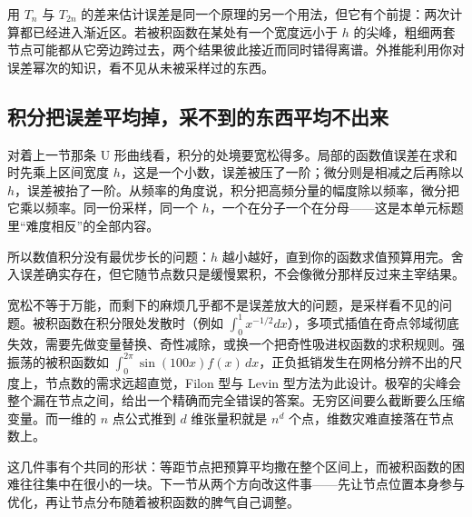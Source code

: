 用 \(T_n\) 与 \(T_{2n}\) 的差来估计误差是同一个原理的另一个用法，但它有个前提：两次计算都已经进入渐近区。若被积函数在某处有一个宽度远小于 \(h\) 的尖峰，粗细两套节点可能都从它旁边跨过去，两个结果彼此接近而同时错得离谱。外推能利用你对误差幂次的知识，看不见从未被采样过的东西。

\subsection{积分把误差平均掉，采不到的东西平均不出来}

对着上一节那条 U 形曲线看，积分的处境要宽松得多。局部的函数值误差在求和时先乘上区间宽度 \(h\)，这是一个小数，误差被压了一阶；微分则是相减之后再除以 \(h\)，误差被抬了一阶。从频率的角度说，积分把高频分量的幅度除以频率，微分把它乘以频率。同一份采样，同一个 \(h\)，一个在分子一个在分母——这是本单元标题里``难度相反''的全部内容。

所以数值积分没有最优步长的问题：\(h\) 越小越好，直到你的函数求值预算用完。舍入误差确实存在，但它随节点数只是缓慢累积，不会像微分那样反过来主宰结果。

宽松不等于万能，而剩下的麻烦几乎都不是误差放大的问题，是采样看不见的问题。被积函数在积分限处发散时（例如 \(\int_0^1x^{-1/2}dx\)），多项式插值在奇点邻域彻底失效，需要先做变量替换、奇性减除，或换一个把奇性吸进权函数的求积规则。强振荡的被积函数如 \(\int_0^{2\pi}\sin(100x)f(x)\,dx\)，正负抵销发生在网格分辨不出的尺度上，节点数的需求远超直觉，Filon 型与 Levin 型方法为此设计。极窄的尖峰会整个漏在节点之间，给出一个精确而完全错误的答案。无穷区间要么截断要么压缩变量。而一维的 \(n\) 点公式推到 \(d\) 维张量积就是 \(n^d\) 个点，维数灾难直接落在节点数上。

这几件事有个共同的形状：等距节点把预算平均撒在整个区间上，而被积函数的困难往往集中在很小的一块。下一节从两个方向改这件事——先让节点位置本身参与优化，再让节点分布随着被积函数的脾气自己调整。
